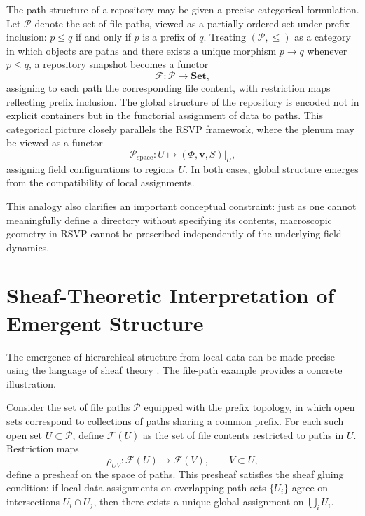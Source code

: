 \documentclass[12pt,a4paper]{article}
\theoremstyle{plain}
\theoremstyle{definition}
\theoremstyle{remark}
\begin{document}
The path structure of a repository may be given a precise categorical
formulation. Let $\mathcal{P}$ denote the set of file paths, viewed as
a partially ordered set under prefix inclusion: $p \leq q$ if and only
if $p$ is a prefix of $q$. Treating $(\mathcal{P},\leq)$ as a category
in which objects are paths and there exists a unique morphism $p \to q$
whenever $p \leq q$, a repository snapshot becomes a functor
\begin{equation}
\mathcal{F} : \mathcal{P} \rightarrow \mathbf{Set},
\end{equation}
assigning to each path the corresponding file content, with restriction
maps reflecting prefix inclusion. The global structure of the
repository is encoded not in explicit containers but in the functorial
assignment of data to paths. This categorical picture closely parallels
the RSVP framework, where the plenum may be viewed as a functor
\begin{equation}
\mathcal{P}_{\mathrm{space}} : U \mapsto (\Phi,\mathbf{v},S)|_U,
\end{equation}
assigning field configurations to regions $U$. In both cases, global
structure emerges from the compatibility of local assignments.

This analogy also clarifies an important conceptual constraint: just as
one cannot meaningfully define a directory without specifying its
contents, macroscopic geometry in RSVP cannot be prescribed
independently of the underlying field dynamics.

\section{Sheaf-Theoretic Interpretation of Emergent Structure}
\label{sec:sheafinterpretation}

The emergence of hierarchical structure from local data can be made
precise using the language of sheaf theory \cite{CostelloGwilliam,
Kashiwara}. The file-path example provides a concrete illustration.

Consider the set of file paths $\mathcal{P}$ equipped with the prefix
topology, in which open sets correspond to collections of paths sharing
a common prefix. For each such open set $U \subset \mathcal{P}$, define
$\mathcal{F}(U)$ as the set of file contents restricted to paths in
$U$. Restriction maps
\begin{equation}
\rho_{UV} : \mathcal{F}(U) \rightarrow \mathcal{F}(V), \qquad V \subset U,
\end{equation}
define a presheaf on the space of paths. This presheaf satisfies the
sheaf gluing condition: if local data assignments on overlapping path
sets $\{U_i\}$ agree on intersections $U_i \cap U_j$, then there
exists a unique global assignment on $\bigcup_i U_i$.
\end{document}
